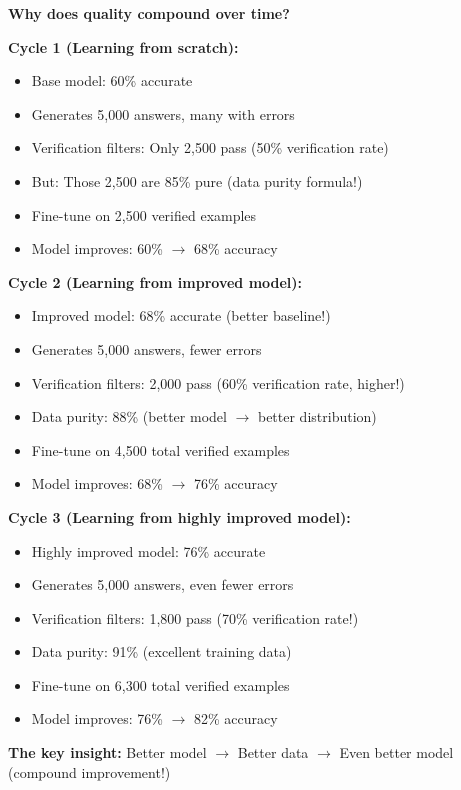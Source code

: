 \documentclass[12pt,a4paper]{article}
\theoremstyle{definition}
\begin{document}
\begin{intuitionbox}
\textbf{Why does quality compound over time?}

\textbf{Cycle 1 (Learning from scratch):}
\begin{itemize}
    \item Base model: 60\% accurate
    \item Generates 5,000 answers, many with errors
    \item Verification filters: Only 2,500 pass (50\% verification rate)
    \item But: Those 2,500 are 85\% pure (data purity formula!)
    \item Fine-tune on 2,500 verified examples
    \item Model improves: 60\% $\rightarrow$ 68\% accuracy
\end{itemize}

\textbf{Cycle 2 (Learning from improved model):}
\begin{itemize}
    \item Improved model: 68\% accurate (better baseline!)
    \item Generates 5,000 answers, fewer errors
    \item Verification filters: 2,000 pass (60\% verification rate, higher!)
    \item Data purity: 88\% (better model $\rightarrow$ better distribution)
    \item Fine-tune on 4,500 total verified examples
    \item Model improves: 68\% $\rightarrow$ 76\% accuracy
\end{itemize}

\textbf{Cycle 3 (Learning from highly improved model):}
\begin{itemize}
    \item Highly improved model: 76\% accurate
    \item Generates 5,000 answers, even fewer errors
    \item Verification filters: 1,800 pass (70\% verification rate!)
    \item Data purity: 91\% (excellent training data)
    \item Fine-tune on 6,300 total verified examples
    \item Model improves: 76\% $\rightarrow$ 82\% accuracy
\end{itemize}

\textbf{The key insight:} Better model $\rightarrow$ Better data $\rightarrow$ Even better model (compound improvement!)
\end{intuitionbox}
\end{document}

